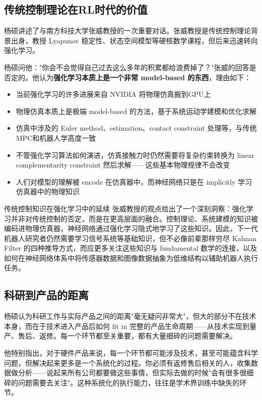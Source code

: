 \documentclass[a4paper]{article}
\begin{document}
\subsection{传统控制理论在RL时代的价值}

杨硕讲述了与南方科技大学张威教授的一次重要对话。张威教授是传统控制理论背景出身，教授 Lyapunov 稳定性、状态空间模型等硬核数学课程，但后来迅速转向强化学习。

杨硕问他："你会不会觉得自己过去这么多年的积累都给浪费掉了？"张威的回答是否定的。他认为\textbf{强化学习本质上是一个非常 model-based 的东西}，理由如下：

\begin{itemize}
    \item 当前强化学习的许多进展来自 NVIDIA 将物理仿真搬到GPU上
    \item 物理仿真本质上是极端 model-based 的方法，基于系统运动学建模和优化求解
    \item 仿真中涉及的 Euler method、estimation、contact constraint 处理等，与传统MPC和机器人学高度一致
    \item 不管强化学习算法如何演进，仿真接触力时仍然需要将复杂约束转换为 linear complementarity constraint 然后求解——这些基本物理规律不会改变
    \item 人们对模型的理解被 encode 在仿真器中，而神经网络只是在 implicitly 学习仿真器中的物理知识
\end{itemize}

\begin{importantbox}{传统控制知识在强化学习中的延续}
张威教授的观点给出了一个深刻洞察：强化学习并非对传统控制的否定，而是在更高层面的融合。控制理论、系统建模的知识被编码进物理仿真器，神经网络通过强化学习隐式地学习了这些知识。因此，下一代机器人研究者仍然需要学习信号系统等基础知识，但不必像前辈那样穷尽 Kalman Filter 的四种推导方式，而应更多关注这些知识与 fundamental 数学的连接，以及如何在神经网络体系中将传感器数据和图像数据抽象为低维结构以辅助机器人执行任务。
\end{importantbox}

\subsection{科研到产品的距离}

杨硕认为科研工作与实际产品之间的距离"毫无疑问非常大"，但大的部分不在技术本身，而在于技术进入产品后如何 fit in 完整的产品生命周期——从技术实现到量产、售后、返修。每一个环节都至关重要，都有大量细碎的问题需要解决。

他特别指出，对于硬件产品来说，每一个环节都可能涉及技术，甚至可能蕴含科学问题，但解决起来更多是一个系统化的过程。你必须有返修售后相关的人，收集数据做分析——说起来所有公司都要做这些事情，但实际去做的时候"会有很多很细碎的问题需要去关注"。这种系统化的执行能力，往往是学术界训练中缺失的环节。
\end{document}
